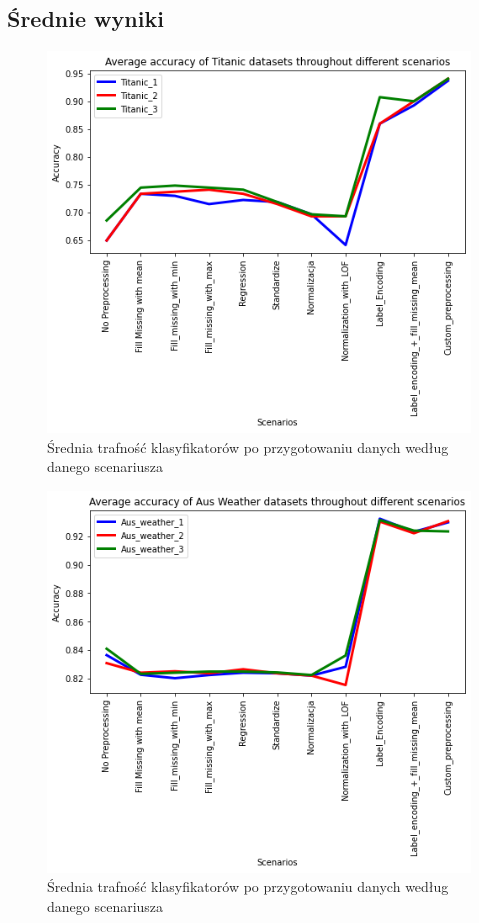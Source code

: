 \documentclass{book}
\begin{document}
\subsection{Średnie wyniki}

\begin{figure}[H]
\centerline{\includegraphics{Titanic_Avg}}
\centering
\caption{Średnia trafność klasyfikatorów po przygotowaniu 
danych według danego scenariusza}
\end{figure}
            
\begin{figure}[H]
\centerline{\includegraphics{Aus_Weather_Avg}}
\centering
\caption{Średnia trafność klasyfikatorów po przygotowaniu 
danych według danego scenariusza}
\end{figure}
            
\end{document}
